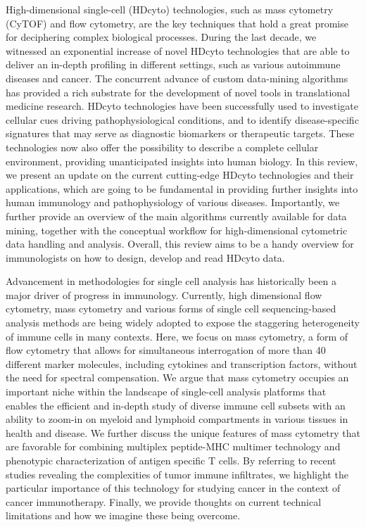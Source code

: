 \citep{galliEndOmicsHigh2019}
High-dimensional single-cell (HDcyto) technologies, such as mass cytometry
(CyTOF) and flow cytometry, are the key techniques that hold a great promise
for deciphering complex biological processes. During the last decade, we
witnessed an exponential increase of novel HDcyto technologies that are able to
deliver an in-depth profiling in different settings, such as various autoimmune
diseases and cancer. The concurrent advance of custom data-mining algorithms
has provided a rich substrate for the development of novel tools in
translational medicine research. HDcyto technologies have been successfully
used to investigate cellular cues driving pathophysiological conditions, and to
identify disease-specific signatures that may serve as diagnostic biomarkers or
therapeutic targets. These technologies now also offer the possibility to
describe a complete cellular environment, providing unanticipated insights into
human biology. In this review, we present an update on the current cutting-edge
HDcyto technologies and their applications, which are going to be fundamental
in providing further insights into human immunology and pathophysiology of
various diseases. Importantly, we further provide an overview of the main
algorithms currently available for data mining, together with the conceptual
workflow for high-dimensional cytometric data handling and analysis. Overall,
this review aims to be a handy overview for immunologists on how to design,
develop and read HDcyto data.

\citep{simoniMassCytometryPowerful2018}
Advancement in methodologies for single cell analysis has historically been a
major driver of progress in immunology. Currently, high dimensional flow
cytometry, mass cytometry and various forms of single cell sequencing-based
analysis methods are being widely adopted to expose the staggering
heterogeneity of immune cells in many contexts. Here, we focus on mass
cytometry, a form of flow cytometry that allows for simultaneous interrogation
of more than 40 different marker molecules, including cytokines and
transcription factors, without the need for spectral compensation. We argue
that mass cytometry occupies an important niche within the landscape of
single-cell analysis platforms that enables the efficient and in-depth study of
diverse immune cell subsets with an ability to zoom-in on myeloid and lymphoid
compartments in various tissues in health and disease. We further discuss the
unique features of mass cytometry that are favorable for combining multiplex
peptide-MHC multimer technology and phenotypic characterization of antigen
specific T cells. By referring to recent studies revealing the complexities of
tumor immune infiltrates, we highlight the particular importance of this
technology for studying cancer in the context of cancer immunotherapy. Finally,
we provide thoughts on current technical limitations and how we imagine these
being overcome.

\printbibliography

